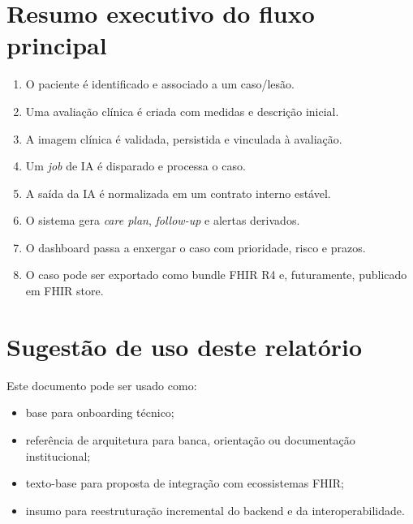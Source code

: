 \documentclass[
    12pt,
    openright,
    oneside,
    a4paper,
    chapter=TITLE,
    section=TITLE,
    brazil,
    sumario=tradicional,
    hidelinks
]{abntex2}
\begin{document}
\apendices

\chapter{Resumo executivo do fluxo principal}

\begin{enumerate}
    \item O paciente \'e identificado e associado a um caso/les\~ao.
    \item Uma avalia\c{c}\~ao cl\'inica \'e criada com medidas e descri\c{c}\~ao inicial.
    \item A imagem cl\'inica \'e validada, persistida e vinculada \`a avalia\c{c}\~ao.
    \item Um \textit{job} de IA \'e disparado e processa o caso.
    \item A sa\'ida da IA \'e normalizada em um contrato interno est\'avel.
    \item O sistema gera \textit{care plan}, \textit{follow-up} e alertas derivados.
    \item O dashboard passa a enxergar o caso com prioridade, risco e prazos.
    \item O caso pode ser exportado como bundle FHIR R4 e, futuramente, publicado em FHIR store.
\end{enumerate}

\chapter{Sugest\~ao de uso deste relat\'orio}

Este documento pode ser usado como:

\begin{itemize}
    \item base para onboarding t\'ecnico;
    \item refer\^encia de arquitetura para banca, orienta\c{c}\~ao ou documenta\c{c}\~ao institucional;
    \item texto-base para proposta de integra\c{c}\~ao com ecossistemas FHIR;
    \item insumo para reestrutura\c{c}\~ao incremental do backend e da interoperabilidade.
\end{itemize}

\postextual
\end{document}
